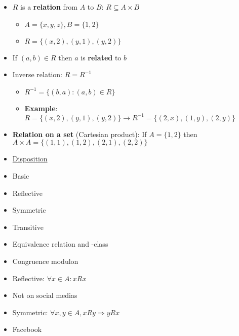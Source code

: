\documentclass[english,10pt,a4paper]{article}
\begin{document}
\begin{minipage}{0.7\linewidth}
\begin{theo}[Basic] 
\begin{itemize}
\item $R$ is a \textbf{relation} from $A$ to $B$: $R \subseteq A \times B$
\begin{itemize}
\item $A=\{x,y,z\}, B=\{1,2\}$
\item[] $R=\{(x,2),(y,1), (y,2) \}$
\end{itemize}
\item If $(a,b) \in R$ then $a$ is \textbf{related} to $b$
\item Inverse relation: $R = R^{-1}$
\begin{itemize}
\item $R^{-1} = \{(b,a):(a,b) \in R\}$
\item \textbf{Example}: $R=\{(x,2),(y,1),(y,2)\} \rightarrow R^{-1}=\{(2,x),(1,y),(2,y)\}$
\end{itemize}
\item \textbf{Relation on a set} (Cartesian product): If $A=\{1,2\}$ then $A \times A = \{(1,1),(1,2),(2,1),(2,2)\}$
\end{itemize}
\end{theo}
\end{minipage}
\hspace{0.1cm}
\begin{minipage}{0.25\linewidth}
\begin{itemize}
\item[] \underline{Disposition}
\item Basic
\item Reflective
\item Symmetric
\item Transitive
\item Equivalence relation and -class
\item Congruence modulon
\end{itemize}
\end{minipage}

\noindent
\begin{minipage}{0.48\linewidth}
\begin{theo}[Reflective] 
\begin{itemize}
\item Reflective: $\forall x \in A: xRx$
\item Not on social medias
\end{itemize}
\end{theo}
\end{minipage}
\hspace{0.1cm}
\begin{minipage}{0.48\linewidth}

\begin{theo}[Symmetric] 
\begin{itemize}
\item Symmetric: $\forall x, y \in A, xRy \Rightarrow yRx$
\item Facebook
\end{itemize}
\end{theo}

\end{minipage}
\end{document}
